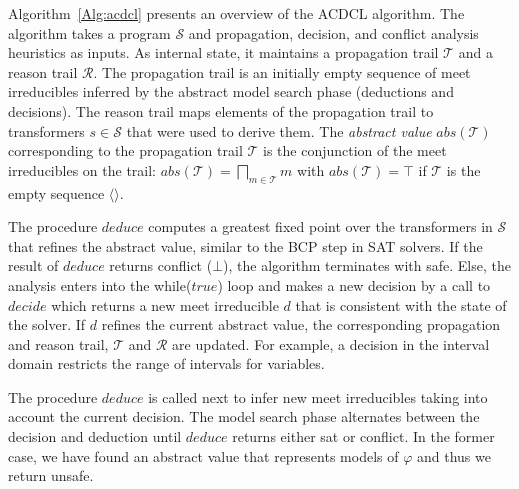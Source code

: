 Algorithm~\ref{Alg:acdcl} presents an overview of the ACDCL algorithm.
The algorithm takes a program 
$\mathcal{S}$ and propagation, decision, and conflict analysis
heuristics as inputs.  As internal state, it maintains a propagation
trail $\mathcal{T}$ and a reason trail  $\mathcal{R}$.
The propagation trail is an initially empty sequence of meet
irreducibles inferred by the abstract model search phase (deductions
and decisions). The reason trail maps  elements of the
propagation trail to transformers $s\in\mathcal{S}$ that were used to
derive them. The \emph{abstract value} $\mathit{abs}(\mathcal{T})$
corresponding to the propagation trail $\mathcal{T}$ is the
conjunction of the meet irreducibles on the trail:
$\mathit{abs}(\mathcal{T})=\bigsqcap_{m \in \mathcal{T}}m$ with
$\mathit{abs}(\mathcal{T})=\top$ if $\mathcal{T}$ is the empty
sequence $\langle\rangle$.

The procedure $deduce$ computes a greatest fixed point over the
transformers in $\mathcal{S}$ that refines the abstract value,
similar to the BCP step in SAT solvers.  If the result of $deduce$
returns \textsf{conflict} ($\bot$), the algorithm terminates with
\textsf{safe}.  Else, the analysis enters into the while($true$) loop
and makes a new decision by a call to $\mathit{decide}$ which returns
a new meet irreducible $d$ that is consistent with the state of the
solver.  If $d$
refines the current abstract value, the corresponding propagation
and reason trail, $\mathcal{T}$ and $\mathcal{R}$ are updated.
%
For example, a decision in the interval domain restricts the range of 
intervals for variables.

The procedure $\mathit{deduce}$ is called next to infer new meet
irreducibles taking into account the current decision.  The model search phase
alternates between the decision and deduction until $\mathit{deduce}$
returns either \textsf{sat} or \textsf{conflict}.
In the former case, we have found an abstract value that represents 
models of $\varphi$ and thus we return \textsf{unsafe}.
%

